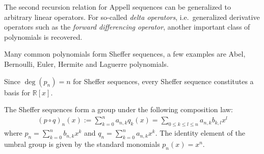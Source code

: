     The second recursion relation for Appell sequences can be generalized to arbitrary linear operators. For so-called \textit{delta operators}, i.e.~generalized derivative operators such as the \textit{forward differencing operator}, another important class of polynomials is recovered.
    \begin{example}
        Many common polynomials form Sheffer sequences, a few examples are Abel, Bernoulli, Euler, Hermite and Laguerre polynomials.
    \end{example}

    \begin{property}
        Since $\deg(p_n)=n$ for Sheffer sequences, every Sheffer sequence constitutes a basis for $\mathbb{R}[x]$.
    \end{property}

    \begin{property}\label{calculus:umbral_composition}
        The Sheffer sequences form a group under the following composition law:
        \begin{gather}
            (p\circ q)_n(x) := \sum_{k=0}^na_{n,k}q_k(x) = \sum_{0\leq k\leq l\leq n}a_{n,k}b_{k,l}x^l
        \end{gather}
        where $p_n=\sum_{k=0}^nb_{n,k}x^k$ and $q_n=\sum_{k=0}^na_{n,k}x^k$. The identity element of the umbral group is given by the standard monomials $p_n(x)=x^n$.
    \end{property}

